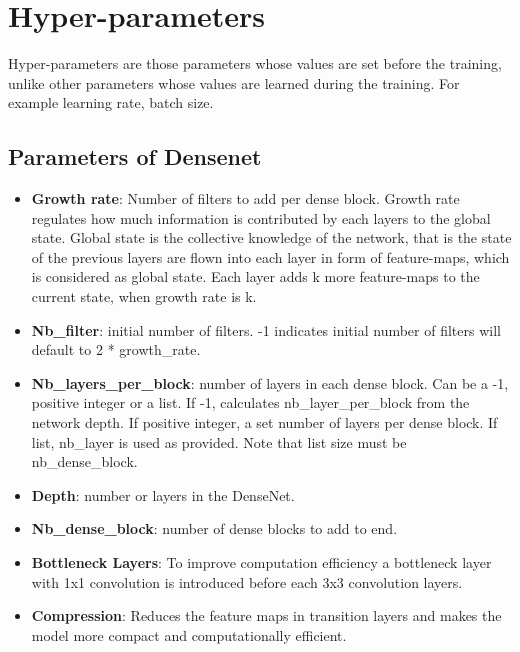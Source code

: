 \section{Hyper-parameters}
Hyper-parameters are those parameters whose values are set before the training, unlike other parameters whose values are learned during the training. 
For example learning rate, batch size. \cite{wikihyper}
\subsection{Parameters of Densenet}
\begin{itemize}
  \item \textbf{Growth rate}: Number of filters to add per dense block. Growth rate regulates how much information is contributed by each layers to the global state. 
  Global state is the collective knowledge of the network, that is the state of the previous layers are flown into each layer in form of feature-maps, 
  which is considered as global state. Each layer adds k more feature-maps to the current state, when growth rate is k.

  \item \textbf{Nb\_filter}: initial number of filters. -1 indicates initial number of filters will default to 2 * growth\_rate.

  \item \textbf{Nb\_layers\_per\_block}: number of layers in each dense block. Can be a -1, positive integer or a list. If -1, calculates nb\_layer\_per\_block from the network depth. 
  If positive integer, a set number of layers per dense block. If list, nb\_layer is used as provided. Note that list size must be nb\_dense\_block.

  \item \textbf{Depth}: number or layers in the DenseNet.

  \item \textbf{Nb\_dense\_block}: number of dense blocks to add to end.

  \item \textbf{Bottleneck Layers}: To improve computation efficiency a bottleneck layer with 1x1 convolution is introduced before each 3x3 convolution layers. 
  \item \textbf{Compression}: Reduces the feature maps in transition layers and makes the model more compact and computationally efficient.
\end{itemize}



